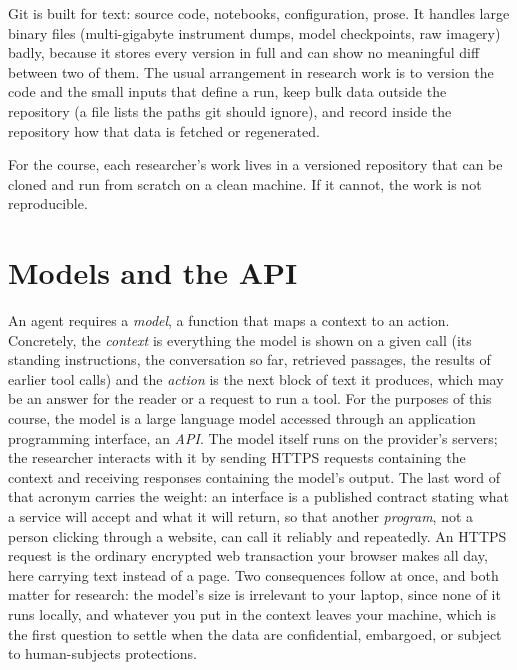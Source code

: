 \begin{remark}
Git is built for text: source code, notebooks, configuration, prose.
It handles large binary files (multi-gigabyte instrument dumps, model checkpoints, raw imagery) badly, because it stores every version in full and can show no meaningful diff between two of them.
The usual arrangement in research work is to version the code and the small inputs that define a run, keep bulk data outside the repository (a  file lists the paths git should ignore), and record inside the repository how that data is fetched or regenerated.
\end{remark}

For the course, each researcher's work lives in a versioned repository that can be cloned and run from scratch on a clean machine.
If it cannot, the work is not reproducible.

\section{Models and the API}
\label{section:Models}

An agent requires a \emph{model}, a function that maps a context to an action.
Concretely, the \emph{context} is everything the model is shown on a given call (its standing instructions, the conversation so far, retrieved passages, the results of earlier tool calls) and the \emph{action} is the next block of text it produces, which may be an answer for the reader or a request to run a tool.
For the purposes of this course, the model is a large language model accessed through an application programming interface, an \emph{API}.
The model itself runs on the provider's servers; the researcher interacts with it by sending HTTPS requests containing the context and receiving responses containing the model's output.
The last word of that acronym carries the weight: an interface is a published contract stating what a service will accept and what it will return, so that another \emph{program}, not a person clicking through a website, can call it reliably and repeatedly.
An HTTPS request is the ordinary encrypted web transaction your browser makes all day, here carrying text instead of a page.
Two consequences follow at once, and both matter for research: the model's size is irrelevant to your laptop, since none of it runs locally, and whatever you put in the context leaves your machine, which is the first question to settle when the data are confidential, embargoed, or subject to human-subjects protections.

